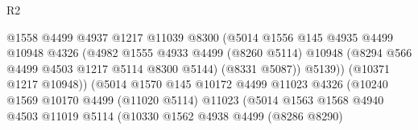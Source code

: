 \begin{lexlean}{R2}
\begin{coremodule}
                                              @1558
                                              @4499
                                              @4937
                                              @1217
                                              @11039
                                              @8300
                                              (@5014
                                                @1556
                                                @145
                                                @4935
                                                @4499
                                                @10948
                                                @4326
                                                (@4982
                                                  @1555
                                                  @4933
                                                  @4499
                                                  (@8260 @5114)
                                                  @10948
                                                  (@8294 @566 @4499 @4503 @1217 @5114 @8300 @5144)
                                                  (@8331 @5087))
                                                @5139))
                                            (@10371 @1217 @10948))
                                          (@5014
                                            @1570
                                            @145
                                            @10172
                                            @4499
                                            @11023
                                            @4326
                                            (@10240
                                              @1569
                                              @10170
                                              @4499
                                              (@11020 @5114)
                                              @11023
                                              (@5014
                                                @1563
                                                @1568
                                                @4940
                                                @4503
                                                @11019
                                                @5114
                                                (@10330
                                                  @1562
                                                  @4938
                                                  @4499
                                                  (@8286 @8290)

\end{coremodule}
\end{lexlean}
